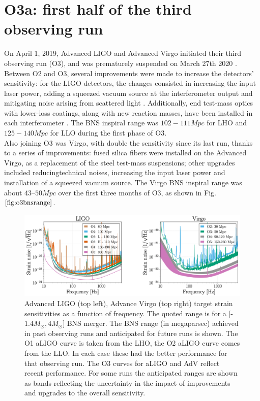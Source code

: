 \documentclass[binding=0.6cm, LaM]{sapthesis}
\begin{document}
\section{O3a: first half of the third observing run}

	On April 1, 2019, Advanced LIGO and Advanced Virgo initiated their third observing run (O3), 
	and was prematurely suspended on March 27th 2020 \cite{53}.
	Between O2 and O3, several improvements were made to increase the detectors’ sensitivity: for the LIGO detectors, 
	the changes consisted in increasing the input laser power, adding a squeezed vacuum source 
	at the interferometer output and mitigating noise arising from scattered light .  
	Additionally, end test-mass optics with lower-loss coatings, along with new reaction masses, 
	have been installed in each interferometer \cite{53}. 
	The BNS inspiral range was $102-111 Mpc$ for LHO and $125-140 Mpc$ for LLO during the first phase of O3. \\
	 Also joining O3 was Virgo, with double the sensitivity since its last run, thanks to a series of improvements: 
	fused silica fibers were installed on the Advanced Virgo, as a replacement of the steel test-mass suspensions;
	other upgrades included reducingtechnical noises, increasing the input laser power 
	and installation of a squeezed vacuum source. 
	The Virgo BNS inspiral range was about $43–50 Mpc$ over the first three months of O3, as shown in Fig.$\ref{fig:o3bnsrange}$. 
                \begin{figure}[H]
                        \label{o3bnsrange}
                        \includegraphics[scale=0.5]{o3bnsrange}
                        \centering
                        \caption{Advanced LIGO (top left), Advance Virgo (top right) target strain sensitivities as a function of frequency. 
				      The quoted range is for a [-$1.4M_\odot, 4 M_\odot]$ BNS merger. The BNS range (in megaparsec) achieved in past 
				      observing runs and anticipated for future runs is shown. The O1 aLIGO curve is taken from the LHO, 
				      the O2 aLIGO curve comes from the LLO. In each case these had the better performance for that observing run. 
				      The O3 curves for aLIGO and AdV reflect recent performance. For some runs the anticipated ranges are shown 
				      as bands reflecting the uncertainty in the impact of improvements and upgrades to the overall sensitivity. \cite{53}} 
                        \label{fig:o3bnsrange}
                \end{figure}
\end{document}

